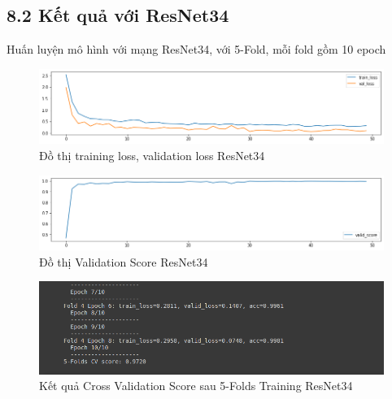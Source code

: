 \documentclass{article}
\begin{document}
	\subsection{8.2 Kết quả với ResNet34}
	Huấn luyện mô hình với mạng ResNet34, với 5-Fold, mỗi fold gồm 10 epoch
	\begin{figure}[H]
		\centering
		\includegraphics[width=1\linewidth]{results/resnet34/training_loss_results.png}
		\caption{Đồ thị training loss, validation loss ResNet34}
		\label{fig:writing-thesis}
	\end{figure}
	\begin{figure}[H]
		\centering
		\includegraphics[width=1\linewidth]{results/resnet34/valid_score_results.png}
		\caption{Đồ thị Validation Score ResNet34}
		\label{fig:writing-thesis}
	\end{figure}
	\begin{figure}[H]
		\centering
		\includegraphics[width=1\linewidth]{results/resnet34/CV_Score_5_Folds_ResNet34.png}
		\caption{Kết quả Cross Validation Score sau 5-Folds Training ResNet34}
		\label{fig:writing-thesis}
	\end{figure}
\end{document}

